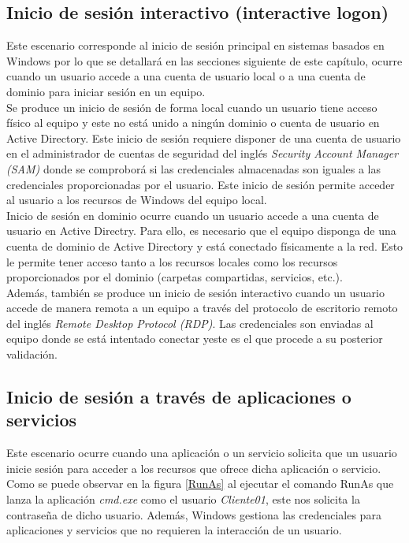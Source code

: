 \subsection{Inicio de sesión interactivo (interactive logon)}

Este escenario corresponde al inicio de sesión principal en sistemas basados en Windows por lo que se detallará en las secciones siguiente de este capítulo, ocurre cuando un usuario accede a una cuenta de usuario local o a una cuenta de dominio para iniciar sesión en un equipo. \\

Se produce un inicio de sesión de forma local cuando un usuario tiene acceso físico al equipo y este no está unido a ningún dominio o cuenta de usuario en Active Directory. Este inicio de sesión requiere disponer de una cuenta de usuario en el administrador de cuentas de seguridad del inglés {\it Security Account Manager (SAM)} donde se comproborá si las credenciales almacenadas son iguales a las credenciales proporcionadas por el usuario. Este inicio de sesión permite acceder al usuario a los recursos de Windows del equipo local. \\

Inicio de sesión en dominio ocurre cuando un usuario accede a una cuenta de usuario en Active Directry. Para ello, es necesario que el equipo disponga de una cuenta de dominio de Active Directory y está conectado físicamente a la red. Esto le permite tener acceso tanto a los recursos locales como los recursos proporcionados por el dominio (carpetas compartidas, servicios, etc.). \\

Además, también se produce  un inicio de sesión interactivo cuando un usuario accede de manera remota a un equipo a través del protocolo de escritorio remoto del inglés {\it Remote Desktop Protocol (RDP)}. Las credenciales son enviadas al equipo donde se está intentado conectar yeste es el que procede a su posterior validación. 

\subsection{Inicio de sesión a través de aplicaciones o servicios}

Este escenario ocurre cuando una aplicación o un servicio solicita que un usuario inicie sesión para acceder a los recursos que ofrece dicha aplicación o servicio. Como se puede observar en la figura \ref{RunAs} al ejecutar el comando RunAs que lanza la aplicación {\it cmd.exe} como el usuario {\it Cliente01}, este nos solicita la contraseña de dicho usuario. Además, Windows gestiona las credenciales para aplicaciones y servicios que no requieren la interacción de un usuario. \\


